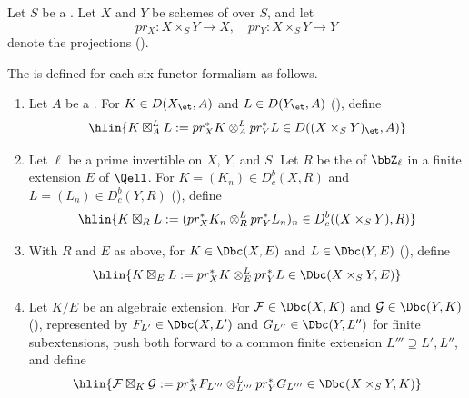 \begin{definition} \label{definition:external_tensor_product_on_fiber_product_of_etale_sheaves_over_a_base_scheme}
    Let $S$ be a . Let $X$ and $Y$ be schemes of  over $S$, and let
    $$pr_X: X \times_S Y \to X, \quad pr_Y: X \times_S Y \to Y$$
    denote the projections ().

    The  is defined for each six functor formalism as follows.
    \begin{enumerate}
        \item Let $A$ be a  . For $K \in D(X_{\et}, A)$ and $L \in D(Y_{\et}, A)$ (), define
        $$\hlin{K \boxtimes_A^L L := pr_X^* K \otimes_A^L pr_Y^* L \in D((X \times_S Y)_{\et}, A)}$$

        \item Let $\ell$ be a prime invertible on $X$, $Y$, and $S$. Let $R$ be the  of $\bbZ_\ell$ in a finite extension $E$ of $\Qell$. For $K = (K_n) \in D_c^b(X,R)$ and $L = (L_n) \in D_c^b(Y,R)$ (), define
        $$\hlin{K \boxtimes_R L := (pr_X^* K_n \otimes_R^L pr_Y^* L_n)_n \in D_c^b((X \times_S Y),R)}$$

        \item With $R$ and $E$ as above, for $K \in \Dbc(X,E)$ and $L \in \Dbc(Y,E)$ (), define
        $$\hlin{K \boxtimes_E L := pr_X^* K \otimes_E^L pr_Y^* L \in \Dbc(X \times_S Y, E)}$$

        \item Let $K/E$ be an algebraic extension. For $\mathcal{F} \in \Dbc(X,K)$ and $\mathcal{G} \in \Dbc(Y,K)$ (), represented by $F_{L'} \in \Dbc(X,L')$ and $G_{L''} \in \Dbc(Y,L'')$ for finite subextensions, push both forward to a common finite extension $L''' \supseteq L', L''$, and define
        $$\hlin{\mathcal{F} \boxtimes_K \mathcal{G} := pr_X^* F_{L'''} \otimes_{L'''}^L pr_Y^* G_{L'''} \in \Dbc(X \times_S Y, K)}$$
    \end{enumerate}


\end{definition}
